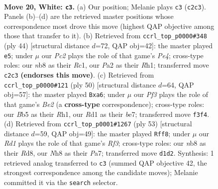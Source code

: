 \documentclass[11pt]{article}
\begin{document}
\clearpage

\begin{figure}[p]\centering
\begin{subfigure}{0.46\textwidth}\centering
\resizebox{\linewidth}{!}{%
\newchessgame
\chessboard[
  setfen={rnk3nN/8/1p6/pB1ppbpp/3p4/b4P1P/P1P3PR/3RK3 w - - 0 20},
  showmover=false,
  pgfstyle=straightmove, color=movearrow, markmove={c2-c3}
]}
\caption{}
\end{subfigure}\hfill
\begin{subfigure}{0.46\textwidth}\centering
\resizebox{\linewidth}{!}{%
\newchessgame
\chessboard[
  setfen={2k2r2/pb3pp1/1p5p/2p4P/2BnP3/5P2/P2K2P1/2R4R w - - 0 23},
  showmover=false,
  pgfstyle=straightmove, color=movearrow, markmove={e4-e5}
]}
\caption{}
\end{subfigure}
\\[4pt]
\begin{subfigure}{0.46\textwidth}\centering
\resizebox{\linewidth}{!}{%
\newchessgame
\chessboard[
  setfen={3k2r1/4bpp1/ppb1p3/2p4p/P3P2P/4BPP1/1PP1B3/1K5R w - - 0 26},
  showmover=false,
  pgfstyle=straightmove, color=movearrow, markmove={e2-a6}
]}
\caption{}
\end{subfigure}\hfill
\begin{subfigure}{0.46\textwidth}\centering
\resizebox{\linewidth}{!}{%
\newchessgame
\chessboard[
  setfen={3r2k1/p1n3b1/1p1p1rpp/3Pp3/7P/4BPP1/PP1NR2K/3R4 b - - 2 27},
  showmover=false,
  pgfstyle=straightmove, color=movearrow, markmove={f6-f8}
]}
\caption{}
\end{subfigure}
\caption{\textbf{Move 20, White: \texttt{c3}.} (a) Our position; Melanie plays \texttt{c3} (\texttt{c2c3}). Panels (b)--(d) are the retrieved master positions whose correspondence most drove this move (highest QAP objective among those that transfer to it). (b) Retrieved from \texttt{ccrl\_top\_p0000\#348} (ply 44) [structural distance $d$=72, QAP obj=42]: the master played \texttt{e5}; under $\mu$ our \emph{Pc2} plays the role of that game's \emph{Pe4}; cross-type roles: our \emph{n}b8 as their \emph{R}c1, our \emph{P}a2 as their \emph{R}h1; transferred move \texttt{c2c3} \textbf{(endorses this move)}. (c) Retrieved from \texttt{ccrl\_top\_p0000\#121} (ply 50) [structural distance $d$=64, QAP obj=57]: the master played \texttt{Bxa6}; under $\mu$ our \emph{Pf3} plays the role of that game's \emph{Be2} (a \textbf{cross-type} correspondence); cross-type roles: our \emph{B}b5 as their \emph{R}h1, our \emph{R}d1 as their \emph{b}e7; transferred move \texttt{f3f4}. (d) Retrieved from \texttt{ccrl\_top\_p0001\#1267} (ply 53) [structural distance $d$=59, QAP obj=49]: the master played \texttt{Rff8}; under $\mu$ our \emph{Rd1} plays the role of that game's \emph{Rf3}; cross-type roles: our \emph{n}b8 as their \emph{R}d8, our \emph{N}h8 as their \emph{P}a7; transferred move \texttt{d1d2}. Synthesis: 1 retrieved analog transferred to \texttt{c3} (summed QAP objective 42, the strongest correspondence among the candidate moves); Melanie committed it via the \texttt{search} selector.}
\label{fig:thought-m38}
\end{figure}
\end{document}
